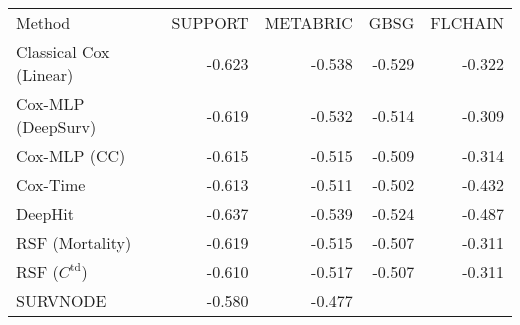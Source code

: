 \begin{tabular}{lrrrr}
    Method &          SUPPORT &         METABRIC &    GBSG &          FLCHAIN \\
    Classical Cox (Linear)       &           -0.623 &           -0.538 &           -0.529 &           -0.322 \\
    Cox-MLP (DeepSurv) &           -0.619 &           -0.532 &           -0.514 &  -0.309 \\
    Cox-MLP (CC)       &           -0.615 &           -0.515 &           -0.509 &           -0.314 \\
    Cox-Time           &           -0.613 &   -0.511 &  -0.502 &           -0.432 \\
    DeepHit            &           -0.637 &           -0.539 &           -0.524 &           -0.487 \\
    RSF (Mortality)    &           -0.619 &           -0.515 &           -0.507 &           -0.311 \\
    RSF ($C^\text{td}$)          &  -0.610 &           -0.517 &           -0.507 &           -0.311 \\
        SURVNODE &  -0.580 &-0.477 & & \\
\end{tabular}